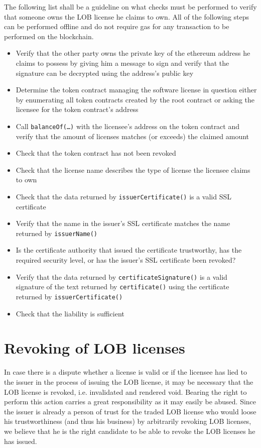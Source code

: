 \documentclass[a4paper]{article}
\begin{document}
The following list shall be a guideline on what checks must be performed to verify that someone owns the LOB license he claims to own. All of the following steps can be performed offline and do not require gas for any transaction to be performed on the blockchain.

\begin{itemize}
  \item Verify that the other party owns the private key of the ethereum address he claims to possess by giving him a message to sign and verify that the signature can be decrypted using the address's public key
  \item Determine the token contract managing the software license in question either by enumerating all token contracts created by the root contract or asking the licensee for the token contract's address
  \item Call \texttt{balanceOf(…)} with the licensee's address on the token contract and verify that the amount of licenses matches (or exceeds) the claimed amount
  \item Check that the token contract has not been revoked
  \item Check that the license name describes the type of license the licensee claims to own
  \item Check that the data returned by \texttt{issuerCertificate()} is a valid SSL certificate
  \item Verify that the name in the issuer's SSL certificate matches the name returned by \texttt{issuerName()}
  \item Is the certificate authority that issued the certificate trustworthy, has the required security level, or has the issuer's SSL certificate been revoked?
  \item Verify that the data returned by \texttt{certificateSignature()} is a valid signature of the text returned by \texttt{certificate()} using the certificate returned by \texttt{issuerCertificate()}
  \item Check that the liability is sufficient
\end{itemize}

\section{Revoking of LOB licenses}

In case there is a dispute whether a license is valid or if the licensee has lied to the issuer in the process of issuing the LOB license, it may be necessary that the LOB license is revoked, i.e. invalidated and rendered void. Bearing the right to perform this action carries a great responsibility as it may easily be abused. Since the issuer is already a person of trust for the traded LOB license who would loose his trustworthiness (and thus his business) by arbitrarily revoking LOB licenses, we believe that he is the right candidate to be able to revoke the LOB licenses he has issued. 
\end{document}
